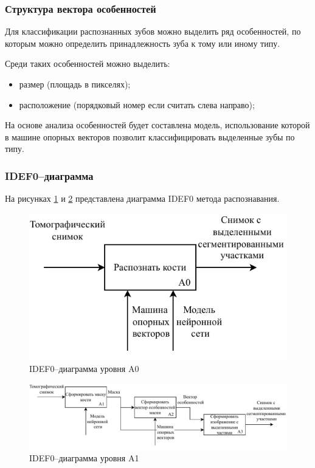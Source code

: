 \subsubsection{Структура вектора особенностей}

Для классификации распознанных зубов можно выделить ряд особенностей, по которым можно определить принадлежность зуба к тому или иному типу.

Среди таких особенностей можно выделить:
\begin{itemize}
	\item размер (площадь в пикселях);
	\item расположение (порядковый номер если считать слева направо);
\end{itemize}

На основе анализа особенностей будет составлена модель, использование которой в машине опорных векторов позволит классифицировать выделенные зубы по типу.

\subsubsection{IDEF0--диаграмма}

На рисунках \ref{fig:idef00} и \ref{fig:idef01} представлена диаграмма IDEF0 метода распознавания.

\begin{figure}[H]
	\centering
	\includegraphics[width=\textwidth]{img/idef00.pdf}
	\caption{IDEF0--диаграмма уровня A0}
	\label{fig:idef00}
\end{figure}

\begin{figure}[H]
	\centering
	\includegraphics[width=\textwidth]{img/idef01.pdf}
	\caption{IDEF0--диаграмма уровня A1}
	\label{fig:idef01}
\end{figure}

